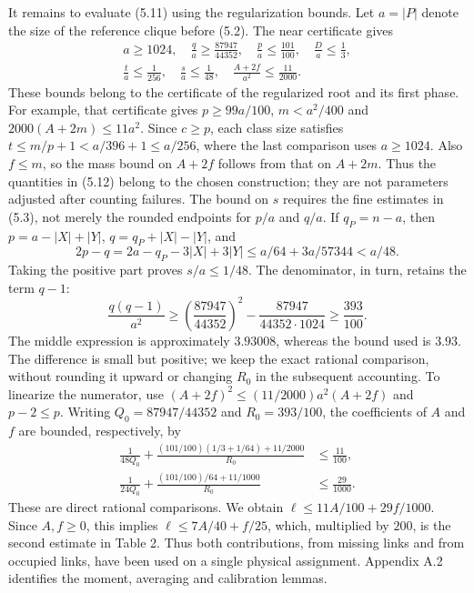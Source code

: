 \documentclass[english,11pt,a4paper]{article}
\begin{document}
It remains to evaluate (5.11) using the regularization bounds. Let \(a=|P|\) denote the size of the reference clique before (5.2). The near certificate gives \[
\begin{gathered}
a\ge1024,\quad \frac qa\ge\frac{87947}{44352},\quad
\frac pa\le\frac{101}{100},\quad \frac Da\le\frac13,\\
\frac ta\le\frac1{256},\quad \frac sa\le\frac1{48},\quad
\frac{A+2f}{a^2}\le\frac{11}{2000}.
\end{gathered}
\tag{5.12}
\] These bounds belong to the certificate of the regularized root and its first phase. For example, that certificate gives \(p\ge99a/100\), \(m<a^2/400\) and \(2000(A+2m)\le11a^2\). Since \(c\ge p\), each class size satisfies \(t\le m/p+1<a/396+1\le a/256\), where the last comparison uses \(a\ge1024\). Also \(f\le m\), so the mass bound on \(A+2f\) follows from that on \(A+2m\). Thus the quantities in (5.12) belong to the chosen construction; they are not parameters adjusted after counting failures. The bound on \(s\) requires the fine estimates in (5.3), not merely the rounded endpoints for \(p/a\) and \(q/a\). If \(q_P=n-a\), then \(p=a-|X|+|Y|\), \(q=q_P+|X|-|Y|\), and \[
2p-q=2a-q_P-3|X|+3|Y|
\le a/64+3a/57344<a/48.
\tag{5.12a}
\] Taking the positive part proves \(s/a\le1/48\). The denominator, in turn, retains the term \(q-1\): \[
\frac{q(q-1)}{a^2}\ge
\left(\frac{87947}{44352}\right)^2
-\frac{87947}{44352\cdot1024}\ge\frac{393}{100}.
\tag{5.13}
\] The middle expression is approximately \(3.93008\), whereas the bound used is \(3.93\). The difference is small but positive; we keep the exact rational comparison, without rounding it upward or changing \(R_0\) in the subsequent accounting. To linearize the numerator, use \((A+2f)^2\le(11/2000)a^2(A+2f)\) and \(p-2\le p\). Writing \(Q_0=87947/44352\) and \(R_0=393/100\), the coefficients of \(A\) and \(f\) are bounded, respectively, by \[
\begin{aligned}
\frac{1}{48Q_0}
+\frac{(101/100)(1/3+1/64)+11/2000}{R_0}
&\le\frac{11}{100},\\
\frac{1}{24Q_0}
+\frac{(101/100)/64+11/1000}{R_0}
&\le\frac{29}{1000}.
\end{aligned}
\tag{5.14}
\] These are direct rational comparisons. We obtain \(\ell\le11A/100+29f/1000\). Since \(A,f\ge0\), this implies \(\ell\le7A/40+f/25\), which, multiplied by \(200\), is the second estimate in Table 2. Thus both contributions, from missing links and from occupied links, have been used on a single physical assignment. Appendix A.2 identifies the moment, averaging and calibration lemmas.
\end{document}
